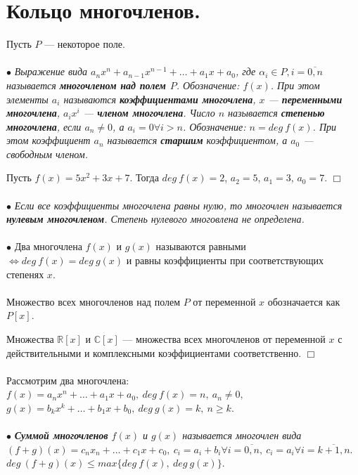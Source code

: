 \documentclass[a4paper, 12pt]{report}
\newenvironment{examp} %
{\par\noindent{\textbf{\textsc{Пример:}}}} %
{\hfill$\scriptstyle\Box$}
\begin{document}
	\section{Кольцо многочленов.}
	Пусть $P$ --- некоторое поле.\\\\
	$\bullet$ \textit{Выражение вида $a_{n}x^n + a_{n-1}x^{n-1} + \ldots + a_1x + a_0$, где $\alpha_i \in P, i = \overline{0,n}$ называется \textbf{многочленом над полем $P$}. Обозначение: $f(x)$. При этом элементы $a_i$ называются \textbf{коэффициентами многочлена}, $x$ --- \textbf{переменными многочлена}, $a_ix^i$ --- \textbf{членом многочлена}. Число $n$ называется \textbf{степенью многочлена}, если $a_n \ne 0$, а $a_i = 0 \forall i > n$. Обозначение: $n = deg\ f(x)$. При этом коэффициент $a_n$ называется \textbf{старшим} коэффициентом, а $a_0$ --- свободным членом.} \\
	\begin{examp}
		Пусть $f(x) = 5x^2 + 3x + 7$. Тогда $deg\ f(x) = 2$, $a_2 = 5$, $a_1 = 3$, $a_0 = 7$.
	\end{examp}\\\\
$\bullet$ \textit{Если все коэффициенты многочлена равны нулю, то многочлен называется \textbf{нулевым многочленом}. Степень нулевого многовлена не определена.}\\\\
$\bullet$ Два многочлена $f(x)$ и $g(x)$ называются равными $\Longleftrightarrow deg\ f(x) = deg\ g(x)$ и равны коэффициенты при соответствующих степенях $x$.\\\\
Множество всех многочленов над полем $P$ от переменной $x$ обозначается как $P[x]$.\\ \begin{examp}
	Множества $\mathbb{R}[x]$ и $\mathbb{C}[x]$ --- множества всех многочленов от переменной $x$ с действительными и комплексными коэффициентами соответственно.
\end{examp}\\\\
Рассмотрим два многочлена:\\
$f(x) = a_nx^n + \ldots + a_1 x + a_0,\ deg\ f(x) = n,\ a_n \ne 0,$\\
$g(x) = b_kx^k +\ldots + b_1x + b_0,\ deg\ g(x) = k,\ n\geqslant k.$\\\\
$\bullet$ \textit{\textbf{Суммой многочленов} $f(x)$ и $g(x)$ называется многочлен вида $(f+g)(x) = c_nx_n + \ldots + c_1x + c_0,\ c_i = a_i + b_i \forall i = \overline{0,n},\ c_i = a_i \forall i = \overline{k+1, n}.$\\
	$deg\ (f+g)(x) \leqslant max\{deg\ f(x),\ deg\ g(x)\}.$}\\\\
\end{document}
